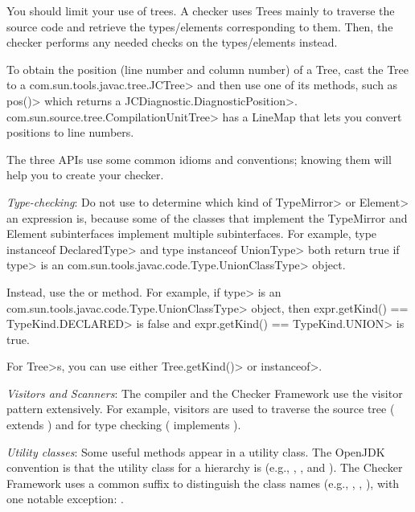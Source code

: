 You should limit your use of trees. A checker uses Trees mainly to
traverse the source code and retrieve the types/elements corresponding to
them.  Then, the checker performs any needed checks on the types/elements instead.

To obtain the position (line number and column number) of a Tree,
cast the Tree to a \<com.sun.tools.javac.tree.JCTree> and then use one of
its methods, such as \<pos()> which returns a \<JCDiagnostic.DiagnosticPosition>.
\<com.sun.source.tree.CompilationUnitTree> has a LineMap that lets you convert
positions to line numbers.



The three APIs use some common idioms and conventions; knowing them will
help you to create your checker.

\emph{Type-checking}:
Do not use  to determine which kind of \<TypeMirror> or \<Element> an expression is,
because some of the classes that implement the TypeMirror and Element subinterfaces implement multiple
subinterfaces. For example, \<type instanceof DeclaredType> and \<type instanceof UnionType>
both return true if \<type> is an \<com.sun.tools.javac.code.Type.UnionClassType> object.

Instead, use the
or
method.  For example, if \<type> is an \<com.sun.tools.javac.code.Type.UnionClassType> object, then
\<expr.getKind() == TypeKind.DECLARED> is false and \<expr.getKind() == TypeKind.UNION> is true.


For \<Tree>s, you can use either \<Tree.getKind()> or \<instanceof>.

\emph{Visitors and Scanners}:
The compiler and the Checker Framework use the visitor pattern
extensively. For example, visitors are used to traverse the source tree
( extends
) and for type
checking ( implements
).

\emph{Utility classes}:
Some useful methods appear in a utility class.  The OpenJDK convention is that
the utility class for a  hierarchy is  (e.g.,
, , and
).  The Checker Framework uses a common
 suffix to distinguish the class names (e.g., ,
, ), with one
notable exception: .


